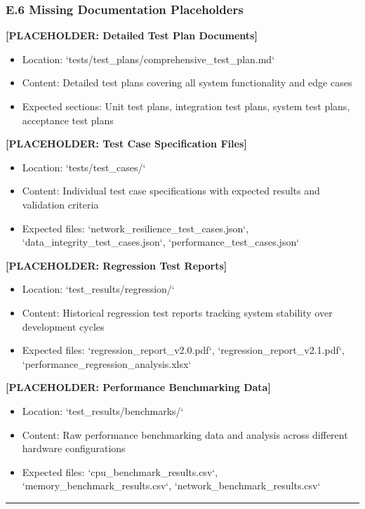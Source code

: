 \documentclass[12pt,a4paper]{article}
\begin{document}
\subsubsection{E.6 Missing Documentation Placeholders}

\textbf{[PLACEHOLDER: Detailed Test Plan Documents]}

\begin{itemize}
\item Location: `tests/test_plans/comprehensive_test_plan.md`
\item Content: Detailed test plans covering all system functionality and edge cases
\item Expected sections: Unit test plans, integration test plans, system test plans, acceptance test plans

\end{itemize}
\textbf{[PLACEHOLDER: Test Case Specification Files]}

\begin{itemize}
\item Location: `tests/test_cases/`
\item Content: Individual test case specifications with expected results and validation criteria
\item Expected files: `network_resilience_test_cases.json`, `data_integrity_test_cases.json`, `performance_test_cases.json`

\end{itemize}
\textbf{[PLACEHOLDER: Regression Test Reports]}

\begin{itemize}
\item Location: `test_results/regression/`
\item Content: Historical regression test reports tracking system stability over development cycles
\item Expected files: `regression_report_v2.0.pdf`, `regression_report_v2.1.pdf`, `performance_regression_analysis.xlsx`

\end{itemize}
\textbf{[PLACEHOLDER: Performance Benchmarking Data]}

\begin{itemize}
\item Location: `test_results/benchmarks/`
\item Content: Raw performance benchmarking data and analysis across different hardware configurations
\item Expected files: `cpu_benchmark_results.csv`, `memory_benchmark_results.csv`, `network_benchmark_results.csv`

\end{itemize}
\hrule
\end{document}
